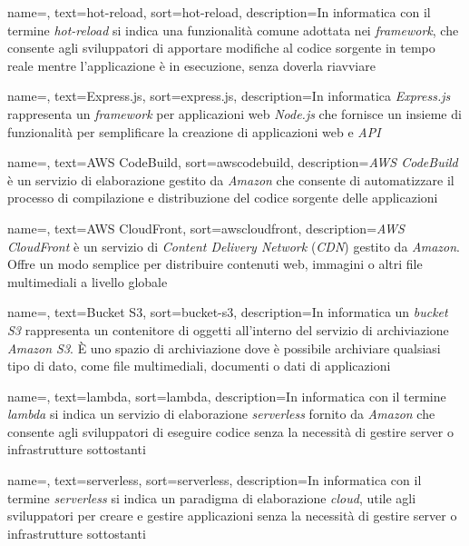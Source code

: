  {
    name=,
    text=hot-reload,
    sort=hot-reload,
    description={In informatica con il termine \emph{hot-reload} si indica una funzionalità comune adottata nei \emph{framework}, che consente agli sviluppatori di apportare modifiche al codice sorgente
    in tempo reale mentre l'applicazione è in esecuzione, senza doverla riavviare}
}

 {
    name=,
    text=Express.js,
    sort=express.js,
    description={In informatica \emph{Express.js} rappresenta un \emph{framework} per applicazioni web \emph{Node.js} che fornisce un insieme di funzionalità per semplificare la creazione di applicazioni web e \emph{API}}
}


 {
    name=,
    text=AWS CodeBuild,
    sort=awscodebuild,
    description={\emph{AWS CodeBuild} è un servizio di elaborazione gestito da \emph{Amazon} che consente di automatizzare il processo di compilazione e distribuzione del codice sorgente delle applicazioni}
}

 {
    name=,
    text=AWS CloudFront,
    sort=awscloudfront,
    description={\emph{AWS CloudFront} è un servizio di \emph{Content Delivery Network} (\emph{CDN}) gestito da \emph{Amazon}. Offre un modo semplice per distribuire contenuti web, immagini o altri file multimediali a livello globale}
}

 {
    name=,
    text=Bucket S3,
    sort=bucket-s3,
    description={In informatica un \emph{bucket S3} rappresenta un contenitore di oggetti all'interno del servizio di archiviazione \emph{Amazon S3}. È uno spazio di archiviazione dove è possibile archiviare qualsiasi tipo di dato, come file multimediali, documenti o dati di applicazioni}
}

 {
    name=,
    text=lambda,
    sort=lambda,
    description={In informatica con il termine \emph{lambda} si indica un servizio di elaborazione \emph{serverless} fornito da \emph{Amazon} che consente agli sviluppatori di eseguire codice senza la necessità di gestire server o infrastrutture sottostanti}
}

 {
    name=,
    text=serverless,
    sort=serverless,
    description={In informatica con il termine \emph{serverless} si indica un paradigma di e\-la\-bo\-ra\-zio\-ne \emph{cloud}, utile agli sviluppatori per creare e gestire applicazioni senza la necessità di gestire server o infrastrutture sottostanti}
}

